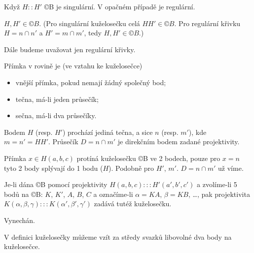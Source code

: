 \documentclass[12pt]{article}					%
\begin{document}
\begin{definice}
	Když $H::H'$ ©B je singulární. V opačném případě je regulární.
\end{definice}

\begin{tvrzeni}[Platí]
	$H, H' \in ©B$. (Pro singulární kuželosečku celá $H H' \in ©B$. Pro regulární křivku $H = n \cap n'$ a $H' = m \cap m'$, tedy $H, H' \in ©B$.)
\end{tvrzeni}

\begin{poznamka}
	Dále budeme uvažovat jen regulární křivky.
\end{poznamka}

\begin{definice}
	Přímka v rovině je (ve vztahu ke kuželosečce)
	\begin{itemize}
		\item vnější přímka, pokud nemají žádný společný bod;
		\item tečna, má-li jeden průsečík;
		\item sečna, má-li dva průsečíky.
	\end{itemize}
\end{definice}

\begin{veta}
	Bodem $H$ (resp. $H'$) prochází jediná tečna, a sice $n$ (resp. $m'$), kde $m = n' = HH'$. Průsečík $D = n \cap m'$ je direkčním bodem zadané projektivity.

	\begin{dukazin}
		Přímka $x \in H(a, b, c)$ protíná kuželosečku ©B ve 2 bodech, pouze pro $x = n$ tyto 2 body splývají do 1 bodu ($H$). Podobně pro $H'$, $m'$. $D = n \cap m'$ už víme.
	\end{dukazin}
\end{veta}

\begin{veta}
	Je-li dána ©B pomocí projektivity $H(a, b, c) ::: H'(a', b', c')$ a zvolíme-li 5 bodů na ©B: $K$, $K'$, $A$, $B$, $C$ a označíme-li $α = KA$, $β = KB$, …, pak projektivita $K(α, β, γ) ::: K(α', β', γ')$ zadává tutéž kuželosečku.

	\begin{dukazin}
		Vynechán.
	\end{dukazin}
\end{veta}

\begin{dusledek}
	V definici kuželosečky můžeme vzít za středy svazků libovolné dva body na kuželosečce.
\end{dusledek}
\end{document}
